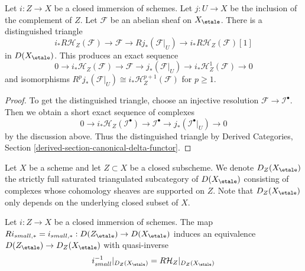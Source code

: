 \begin{lemma}
\label{lemma-cohomology-with-support-triangle}
Let $i : Z \to X$ be a closed immersion of schemes.
Let $j : U \to X$ be the inclusion of the complement of $Z$.
Let $\mathcal{F}$ be an abelian sheaf on $X_\etale$.
There is a distinguished triangle
$$
i_*R\mathcal{H}_Z(\mathcal{F}) \to \mathcal{F} \to Rj_*(\mathcal{F}|_U) \to
i_*R\mathcal{H}_Z(\mathcal{F})[1]
$$
in $D(X_\etale)$. This produces an exact sequence
$$
0 \to i_*\mathcal{H}_Z(\mathcal{F}) \to \mathcal{F} \to
j_*(\mathcal{F}|_U) \to i_*\mathcal{H}^1_Z(\mathcal{F}) \to 0
$$
and isomorphisms
$R^pj_*(\mathcal{F}|_U) \cong i_*\mathcal{H}^{p + 1}_Z(\mathcal{F})$
for $p \geq 1$.
\end{lemma}

\begin{proof}
To get the distinguished triangle, choose an injective resolution
$\mathcal{F} \to \mathcal{I}^\bullet$. Then we obtain a short exact
sequence of complexes
$$
0 \to
i_*\mathcal{H}_Z(\mathcal{I}^\bullet) \to \mathcal{I}^\bullet
\to j_*(\mathcal{I}^\bullet|_U) \to 0
$$
by the discussion above. Thus the distinguished triangle by
Derived Categories, Section \ref{derived-section-canonical-delta-functor}.
\end{proof}

\noindent
Let $X$ be a scheme and let $Z \subset X$ be a closed subscheme.
We denote $D_Z(X_\etale)$ the strictly full saturated triangulated
subcategory of $D(X_\etale)$ consisting of complexes whose cohomology
sheaves are supported on $Z$. Note that $D_Z(X_\etale)$ only
depends on the underlying closed subset of $X$.

\begin{lemma}
\label{lemma-complexes-with-support-on-closed}
Let $i : Z \to X$ be a closed immersion of schemes.
The map $Ri_{small, *} = i_{small, *} : D(Z_\etale) \to D(X_\etale)$
induces an equivalence $D(Z_\etale) \to D_Z(X_\etale)$ with quasi-inverse
$$
i_{small}^{-1}|_{D_Z(X_\etale)} = R\mathcal{H}_Z|_{D_Z(X_\etale)}
$$
\end{lemma}

